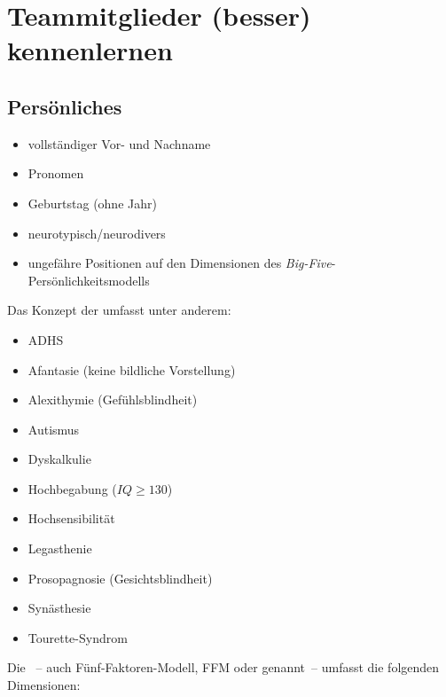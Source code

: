 \section{Teammitglieder (besser) kennenlernen}
\label{Kennenlernen}

\subsection{Persönliches}

\begin{multicols}{2}
  \begin{itemize}
    \item vollständiger Vor- und Nachname
    \item Pronomen
    \item Geburtstag (ohne Jahr)
    \item neurotypisch/neurodivers
    \item ungefähre Positionen auf den Dimensionen des \emph{Big-Five}-Persönlichkeitsmodells
  \end{itemize}
\end{multicols}

Das Konzept der  umfasst unter anderem:

\begin{multicols}{2}
  \begin{itemize}
    \item ADHS
    \item Afantasie (keine bildliche Vorstellung)
    \item Alexithymie (Gefühlsblindheit)
    \item Autismus
    \item Dyskalkulie
    \item Hochbegabung ($IQ \geq 130$)
    \item Hochsensibilität
    \item Legasthenie
    \item Prosopagnosie (Gesichtsblindheit)
    \item Synästhesie
    \item Tourette-Syndrom
  \end{itemize}
\end{multicols}

Die ~-- auch Fünf-Faktoren-Modell, FFM oder  genannt~-- umfasst die folgenden Dimensionen:

